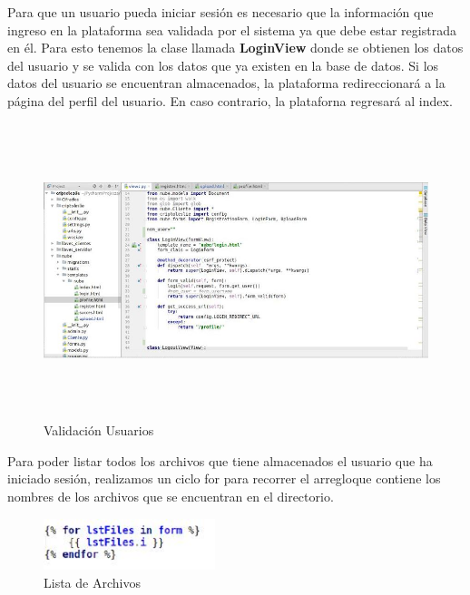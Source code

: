 Para que un usuario pueda iniciar sesión es necesario que la información que ingreso en la plataforma sea validada por el sistema ya que debe estar registrada en él.
Para esto tenemos la clase llamada \textbf{LoginView} donde se obtienen los datos del usuario y se valida con los datos que ya existen en la base de datos. Si los datos del usuario se encuentran almacenados, la plataforma redireccionará a la página del perfil del usuario. En caso contrario, la plataforna regresará al index.

			\begin{figure}[H]
			\centering
			\includegraphics[width=15cm, height=8.6cm]{./images/Interfaz/02.jpg}
			\caption{Validación Usuarios}
			\label{fig:6-4-2} 
			\end{figure} 

Para poder listar todos los archivos que tiene almacenados el usuario que ha iniciado sesión, realizamos un ciclo for para recorrer el arregloque contiene los nombres de los archivos que se encuentran en el directorio.

			\begin{figure}[H]
			\centering
			\includegraphics[width=5cm, height=1.5cm]{./images/Interfaz/03.jpg}
			\caption{Lista de Archivos}
			\label{fig:6-4-3} 
			\end{figure} 

